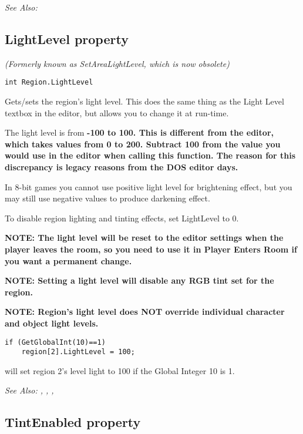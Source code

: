 \it{See Also:} 


\subsection{LightLevel property}\label{Region.LightLevel}%

\it{(Formerly known as SetAreaLightLevel, which is now obsolete)}

\begin{verbatim}
int Region.LightLevel
\end{verbatim}
Gets/sets the region's light level. This does the same thing as the Light Level
textbox in the editor, but allows you to change it at run-time.

The light level is from \bf{-100 to 100}. This is different from the editor, which
takes values from 0 to 200.
Subtract 100 from the value you would use in the editor when calling this function.
The reason for this discrepancy is legacy reasons from the DOS editor days.

In 8-bit games you cannot use positive light level for brightening effect, but you
may still use negative values to produce darkening effect.

To disable region lighting and tinting effects, set LightLevel to 0.

\bf{NOTE}: The light level will be reset to the editor settings when the player leaves the
room, so you need to use it in Player Enters Room if you want a permanent
change.

\bf{NOTE}: Setting a light level will disable any RGB tint set for the region.

\bf{NOTE:} Region's light level does NOT override individual character and object light levels.

\begin{verbatim}
if (GetGlobalInt(10)==1)
    region[2].LightLevel = 100;
\end{verbatim}
will set region 2's level light to 100 if the Global Integer 10 is 1.

\it{See Also:} ,
,
,


\subsection{TintEnabled property}\label{Region.TintEnabled}%

